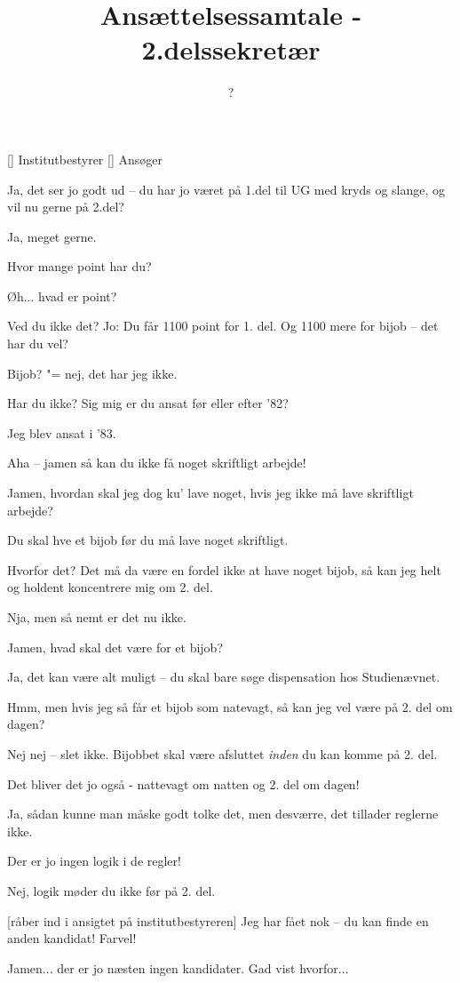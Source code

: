 \documentclass[a4paper,11pt]{article}
\title{Ansættelsessamtale - 2.delssekretær}
\author{?}
\begin{document}
\maketitle

\begin{roles}
[] Institutbestyrer
[] Ansøger
\end{roles}

\begin{sketch}

   Ja, det ser jo godt ud -- du har jo været på 1.del til UG
  med kryds og slange, og vil nu gerne på 2.del?

 Ja, meget gerne.

 Hvor mange point har du?

 Øh... hvad er point?

 Ved du ikke det?  Jo: Du får 1100 point for 1. del.  Og 1100
mere for bijob -- det har du vel?

 Bijob? "= nej, det har jeg ikke.

 Har du ikke?  Sig mig er du ansat før eller efter '82?

 Jeg blev ansat i '83.

 Aha -- jamen så kan du ikke få noget skriftligt arbejde!

 Jamen, hvordan skal jeg dog ku' lave noget, hvis jeg ikke må
lave skriftligt arbejde?

 Du skal hve et bijob før du må lave noget skriftligt.

 Hvorfor det?  Det må da være en fordel ikke at have noget
bijob, så kan jeg helt og holdent koncentrere mig om 2. del.

 Nja, men så nemt er det nu ikke.

 Jamen, hvad skal det være for et bijob?

 Ja, det kan være alt muligt -- du skal bare søge dispensation
hos Studienævnet.

 Hmm, men hvis jeg så får et bijob som natevagt, så kan jeg
vel være på 2. del om dagen?

 Nej nej -- slet ikke.  Bijobbet skal være afsluttet {\em
  inden} du kan komme på 2. del.

 Det bliver det jo også - nattevagt om natten og 2. del om
dagen!

 Ja, sådan kunne man måske godt tolke det, men desværre, det
tillader reglerne ikke.

 Der er jo ingen logik i de regler!

 Nej, logik møder du ikke før på 2. del.

[råber ind i ansigtet på institutbestyreren] Jeg har fået nok
-- du kan finde en anden kandidat!  Farvel!

 Jamen... der er jo næsten ingen kandidater.  Gad vist
hvorfor...

\end{sketch}
\end{document}
